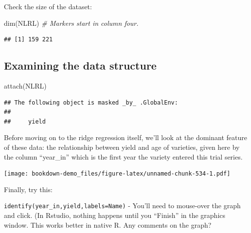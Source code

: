 \documentclass[
]{book}
\newenvironment{Shaded}{\begin{snugshade}}{\end{snugshade}}
\newcommand{\AttributeTok}[1]{\textcolor[rgb]{0.77,0.63,0.00}{#1}}
\newcommand{\CommentTok}[1]{\textcolor[rgb]{0.56,0.35,0.01}{\textit{#1}}}
\newcommand{\FunctionTok}[1]{\textcolor[rgb]{0.00,0.00,0.00}{#1}}
\newcommand{\NormalTok}[1]{#1}
\newcommand{\SpecialCharTok}[1]{\textcolor[rgb]{0.00,0.00,0.00}{#1}}
\begin{document}
Check the size of the dataset:

\begin{Shaded}
\begin{Highlighting}[]
\FunctionTok{dim}\NormalTok{(NLRL)  }\CommentTok{\# Markers start in column four.}
\end{Highlighting}
\end{Shaded}

\begin{verbatim}
## [1] 159 221
\end{verbatim}

\hypertarget{examining-the-data-structure}{%
\subsection{Examining the data structure}\label{examining-the-data-structure}}

\begin{Shaded}
\begin{Highlighting}[]
\FunctionTok{attach}\NormalTok{(NLRL)}
\end{Highlighting}
\end{Shaded}

\begin{verbatim}
## The following object is masked _by_ .GlobalEnv:
## 
##     yield
\end{verbatim}

Before moving on to the ridge regression itself, we'll look at the dominant feature of these data: the relationship between yield and age of varieties, given here by the column ``year\_in'' which is the first year the variety entered this trial series.

\begin{Shaded}
\end{Shaded}

\texttt{[image: bookdown-demo\_files/figure-latex/unnamed-chunk-534-1.pdf]}

Finally, try this:

\texttt{identify(year\_in,yield,labels=Name)} - You'll need to mouse-over the graph and click. (In Rstudio, nothing happens until you ``Finish'' in the graphics window. This works better in native R. Any comments on the graph?
\end{document}
